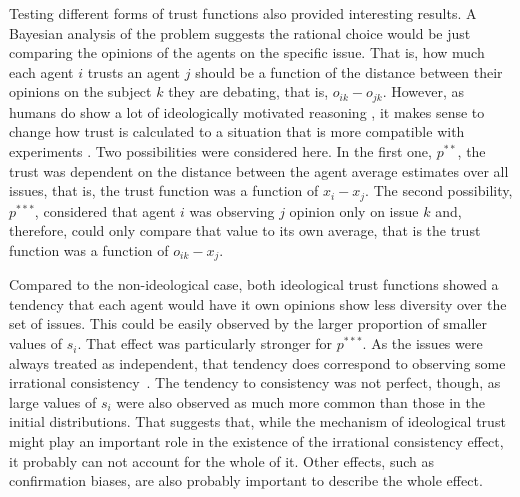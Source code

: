 \documentclass{article}
\begin{document}
    Testing different forms of trust functions also provided interesting
    results. A Bayesian analysis of the problem suggests the rational choice
    would be just comparing the opinions of the agents on the specific issue.
    That is, how much each agent $i$ trusts an agent $j$ should be a function of
    the distance between their opinions on the subject $k$ they are debating,
    that is, $o_{ik}-o_{jk}$. However, as humans do show a lot of ideologically
    motivated reasoning \cite{mercier11a,merciersperber11a,kahanetal11}, it
    makes sense to change how trust is calculated to a situation that is more
    compatible with experiments \cite{jerit2012partisan,
      nyhan2010corrections,reedy2014voters, flynn2017nature}. Two possibilities
    were considered here. In the first one, \( p^{**}\), the trust was dependent
    on the distance between the agent average estimates over all issues, that
    is, the trust function was a function of $x_{i}-x_{j}$. The second
    possibility, \( p^{***}\), considered that agent $i$ was observing $j$
    opinion only on issue $k$ and, therefore, could only compare that value to
    its own average, that is the trust function was a function of
    $o_{ik}-x_{j}$.

    Compared to the non-ideological case, both ideological trust functions
    showed a tendency that each agent would have it own opinions show less
    diversity over the set of issues. This could be easily observed by the
    larger proportion of smaller values of $s_i$. That effect was particularly
    stronger for \( p^{***}\). As the issues were always treated as
    independent, that tendency does correspond to observing some irrational
    consistency~\cite{jervis76a}. The tendency to consistency was not perfect,
    though, as large values of $s_i$ were also observed as much more common than
    those in the initial distributions. That suggests that, while the mechanism
    of ideological trust might play an important role in the existence of the
    irrational consistency effect, it probably can not account for the whole of
    it. Other effects, such as confirmation biases, are also probably important
    to describe the whole effect.
\end{document}
